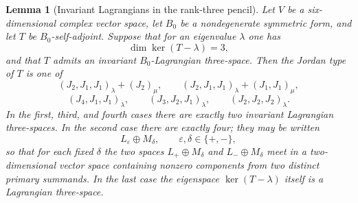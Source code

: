 \documentclass[11pt,reqno]{amsart}
\newtheorem{lemma}[theorem]{Lemma}
\theoremstyle{remark}
\begin{document}
\begin{lemma}[Invariant Lagrangians in the rank-three pencil]\label{lem:r36rank3}
Let $V$ be a six-dimensional complex vector space, let $B_0$ be a nondegenerate symmetric form, and let $T$ be $B_0$-self-adjoint.  Suppose that for an eigenvalue $\lambda$ one has
\[
\dim\ker(T-\lambda)=3,
\]
and that $T$ admits an invariant $B_0$-Lagrangian three-space.  Then the Jordan type of $T$ is one of
\[
(J_2,J_1,J_1)_\lambda+(J_2)_\mu,
\qquad
(J_2,J_1,J_1)_\lambda+(J_1,J_1)_\mu,
\]
\[
(J_4,J_1,J_1)_\lambda,
\qquad
(J_3,J_2,J_1)_\lambda,
\qquad
(J_2,J_2,J_2)_\lambda.
\tag{R3J}\label{eq:r3jordan}
\]
In the first, third, and fourth cases there are exactly two invariant Lagrangian three-spaces.  In the second case there are exactly four; they may be written
\[
L_\varepsilon\oplus M_\delta,
\qquad \varepsilon,\delta\in\{+,-\},
\]
so that for each fixed $\delta$ the two spaces $L_+\oplus M_\delta$ and $L_-\oplus M_\delta$ meet in a two-dimensional vector space containing nonzero components from two distinct primary summands.  In the last case the eigenspace $\ker(T-\lambda)$ itself is a Lagrangian three-space.
\end{lemma}
\end{document}
